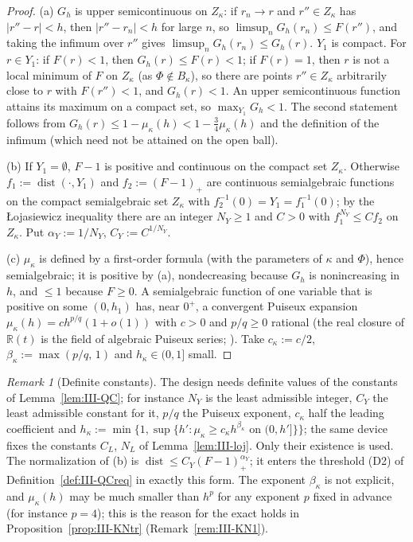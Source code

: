 \documentclass[10pt]{amsart}
\theoremstyle{definition}
\theoremstyle{remark}
\newtheorem{remark}[theorem]{Remark}
\newcommand{\dist}{\operatorname{dist}}
\newcommand{\R}{\mathbb R}
\begin{document}
\begin{proof}
(a) $G_h$ is upper semicontinuous on $Z_\kappa$: if $r_n\to r$ and $r''\in
Z_\kappa$ has $|r''-r|<h$, then $|r''-r_n|<h$ for large $n$, so $\limsup_n
G_h(r_n)\le F(r'')$, and taking the infimum over $r''$ gives $\limsup_nG_h(r_n)
\le G_h(r)$.  $Y_1$ is compact.  For $r\in Y_1$: if $F(r)<1$, then $G_h(r)\le
F(r)<1$; if $F(r)=1$, then $r$ is not a local minimum of $F$ on $Z_\kappa$
(as $\Phi\notin B_\kappa$), so there are points $r''\in Z_\kappa$ arbitrarily close
to $r$ with $F(r'')<1$, and $G_h(r)<1$.  An upper semicontinuous function
attains its maximum on a compact set, so $\max_{Y_1}G_h<1$.  The second
statement follows from $G_h(r)\le1-\mu_\kappa(h)<1-\frac34\mu_\kappa(h)$ and the
definition of the infimum (which need not be attained on the open ball).

(b) If $Y_1=\emptyset$, $F-1$ is positive and continuous on the compact set
$Z_\kappa$.  Otherwise $f_1:=\dist(\cdot,Y_1)$ and $f_2:=(F-1)_+$ are continuous
semialgebraic functions on the compact semialgebraic set $Z_\kappa$ with
$f_2^{-1}(0)=Y_1=f_1^{-1}(0)$; by the {\L}ojasiewicz inequality
\cite[Corollary~2.6.7]{BCR} there are an integer $N_Y\ge1$ and $C>0$ with
$f_1^{N_Y}\le Cf_2$ on $Z_\kappa$.  Put $\alpha_Y:=1/N_Y$, $C_Y:=C^{1/N_Y}$.

(c) $\mu_\kappa$ is defined by a first-order formula (with the parameters of
$\kappa$ and $\Phi$), hence semialgebraic; it is positive by (a),
nondecreasing because $G_h$ is nonincreasing in $h$, and $\le1$ because
$F\ge0$.  A semialgebraic function of one variable that is positive on
some $(0,h_1)$ has, near $0^+$, a convergent Puiseux expansion $\mu_\kappa(h)=
ch^{p/q}(1+o(1))$ with $c>0$ and $p/q\ge0$ rational (the real closure of
$\R(t)$ is the field of algebraic Puiseux series; \cite[Chapter~7]{vdDries}).
Take $c_\kappa:=c/2$, $\beta_\kappa:=\max(p/q,\,1)$ and $h_\kappa\in(0,1]$ small.
\end{proof}

\begin{remark}[Definite constants]\label{rem:III-QCchoice}
The design needs definite values of the constants of Lemma~\ref{lem:III-QC};
for instance $N_Y$ is the least admissible integer, $C_Y$ the least admissible
constant for it, $p/q$ the Puiseux exponent, $c_\kappa$ half the leading
coefficient and $h_\kappa:=\min\{1,\sup\{h':\mu_\kappa\ge c_\kappa h^{\beta_\kappa}
\text{ on }(0,h']\}\}$; the same device fixes the constants $C_L$, $N_L$ of
Lemma~\ref{lem:III-loj}.  Only their existence is used.  The normalization of
(b) is $\dist\le C_Y(F-1)_+^{\alpha_Y}$; it enters the threshold (D2) of
Definition~\ref{def:III-QCreq} in exactly this form.  The exponent
$\beta_\kappa$ is not explicit, and $\mu_\kappa(h)$ may be much smaller than
$h^p$ for any exponent $p$ fixed in advance (for instance $p=4$); this is the reason for the exact holds in
Proposition~\ref{prop:III-KNtr} (Remark~\ref{rem:III-KN1}).
\end{remark}
\end{document}
